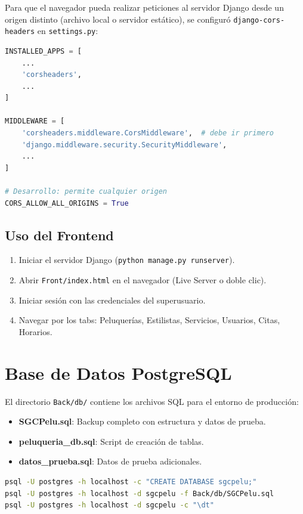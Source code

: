 \documentclass[12pt,a4paper]{article}
\begin{document}
Para que el navegador pueda realizar peticiones al servidor Django desde un origen distinto
(archivo local o servidor estático), se configuró \texttt{django-cors-headers} en
\texttt{settings.py}:

\begin{lstlisting}[language=Python, caption=Configuración CORS en settings.py]
INSTALLED_APPS = [
    ...
    'corsheaders',
    ...
]

MIDDLEWARE = [
    'corsheaders.middleware.CorsMiddleware',  # debe ir primero
    'django.middleware.security.SecurityMiddleware',
    ...
]

# Desarrollo: permite cualquier origen
CORS_ALLOW_ALL_ORIGINS = True
\end{lstlisting}

\subsection{Uso del Frontend}

\begin{enumerate}
    \item Iniciar el servidor Django (\texttt{python manage.py runserver}).
    \item Abrir \texttt{Front/index.html} en el navegador (Live Server o doble clic).
    \item Iniciar sesión con las credenciales del superusuario.
    \item Navegar por los tabs: Peluquerías, Estilistas, Servicios, Usuarios, Citas, Horarios.
\end{enumerate}

\section{Base de Datos PostgreSQL}

El directorio \texttt{Back/db/} contiene los archivos SQL para el entorno de producción:

\begin{itemize}
    \item \textbf{SGCPelu.sql}: Backup completo con estructura y datos de prueba.
    \item \textbf{peluqueria\_db.sql}: Script de creación de tablas.
    \item \textbf{datos\_prueba.sql}: Datos de prueba adicionales.
\end{itemize}

\begin{lstlisting}[language=bash, caption=Importar backup PostgreSQL]
psql -U postgres -h localhost -c "CREATE DATABASE sgcpelu;"
psql -U postgres -h localhost -d sgcpelu -f Back/db/SGCPelu.sql
psql -U postgres -h localhost -d sgcpelu -c "\dt"
\end{lstlisting}
\end{document}
